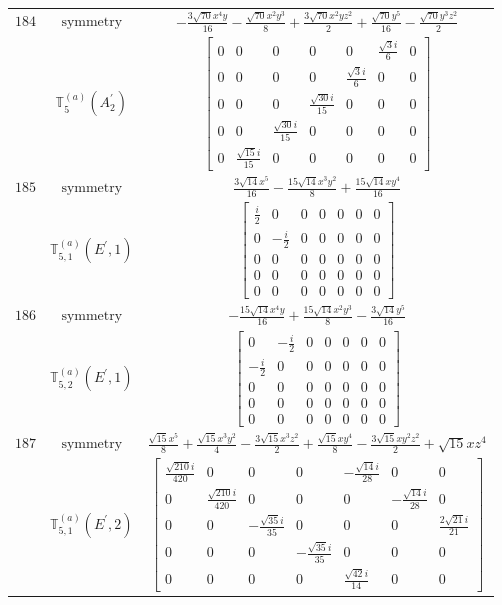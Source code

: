\documentclass[fleqn,8pt,landscape]{jsarticle}
\begin{document}
\begin{longtable}{ccc}
$ 184 $ & $ \text{symmetry} $ & $ - \frac{3 \sqrt{70} x^{4} y}{16} - \frac{\sqrt{70} x^{2} y^{3}}{8} + \frac{3 \sqrt{70} x^{2} y z^{2}}{2} + \frac{\sqrt{70} y^{5}}{16} - \frac{\sqrt{70} y^{3} z^{2}}{2} $ \\
$  $ & $ \mathbb{T}_{5}^{(a)}(A_{2}^{\prime}) $ & $ \begin{bmatrix} 0 & 0 & 0 & 0 & 0 & \frac{\sqrt{3} i}{6} & 0 \\ 0 & 0 & 0 & 0 & \frac{\sqrt{3} i}{6} & 0 & 0 \\ 0 & 0 & 0 & \frac{\sqrt{30} i}{15} & 0 & 0 & 0 \\ 0 & 0 & \frac{\sqrt{30} i}{15} & 0 & 0 & 0 & 0 \\ 0 & \frac{\sqrt{15} i}{15} & 0 & 0 & 0 & 0 & 0 \end{bmatrix} $ \\ \hline
$ 185 $ & $ \text{symmetry} $ & $ \frac{3 \sqrt{14} x^{5}}{16} - \frac{15 \sqrt{14} x^{3} y^{2}}{8} + \frac{15 \sqrt{14} x y^{4}}{16} $ \\
$  $ & $ \mathbb{T}_{5,1}^{(a)}(E^{\prime},1) $ & $ \begin{bmatrix} \frac{i}{2} & 0 & 0 & 0 & 0 & 0 & 0 \\ 0 & - \frac{i}{2} & 0 & 0 & 0 & 0 & 0 \\ 0 & 0 & 0 & 0 & 0 & 0 & 0 \\ 0 & 0 & 0 & 0 & 0 & 0 & 0 \\ 0 & 0 & 0 & 0 & 0 & 0 & 0 \end{bmatrix} $ \\ \hline
$ 186 $ & $ \text{symmetry} $ & $ - \frac{15 \sqrt{14} x^{4} y}{16} + \frac{15 \sqrt{14} x^{2} y^{3}}{8} - \frac{3 \sqrt{14} y^{5}}{16} $ \\
$  $ & $ \mathbb{T}_{5,2}^{(a)}(E^{\prime},1) $ & $ \begin{bmatrix} 0 & - \frac{i}{2} & 0 & 0 & 0 & 0 & 0 \\ - \frac{i}{2} & 0 & 0 & 0 & 0 & 0 & 0 \\ 0 & 0 & 0 & 0 & 0 & 0 & 0 \\ 0 & 0 & 0 & 0 & 0 & 0 & 0 \\ 0 & 0 & 0 & 0 & 0 & 0 & 0 \end{bmatrix} $ \\ \hline
$ 187 $ & $ \text{symmetry} $ & $ \frac{\sqrt{15} x^{5}}{8} + \frac{\sqrt{15} x^{3} y^{2}}{4} - \frac{3 \sqrt{15} x^{3} z^{2}}{2} + \frac{\sqrt{15} x y^{4}}{8} - \frac{3 \sqrt{15} x y^{2} z^{2}}{2} + \sqrt{15} x z^{4} $ \\
$  $ & $ \mathbb{T}_{5,1}^{(a)}(E^{\prime},2) $ & $ \begin{bmatrix} \frac{\sqrt{210} i}{420} & 0 & 0 & 0 & - \frac{\sqrt{14} i}{28} & 0 & 0 \\ 0 & \frac{\sqrt{210} i}{420} & 0 & 0 & 0 & - \frac{\sqrt{14} i}{28} & 0 \\ 0 & 0 & - \frac{\sqrt{35} i}{35} & 0 & 0 & 0 & \frac{2 \sqrt{21} i}{21} \\ 0 & 0 & 0 & - \frac{\sqrt{35} i}{35} & 0 & 0 & 0 \\ 0 & 0 & 0 & 0 & \frac{\sqrt{42} i}{14} & 0 & 0 \end{bmatrix} $ \\ \hline

\end{longtable}
\end{document}
